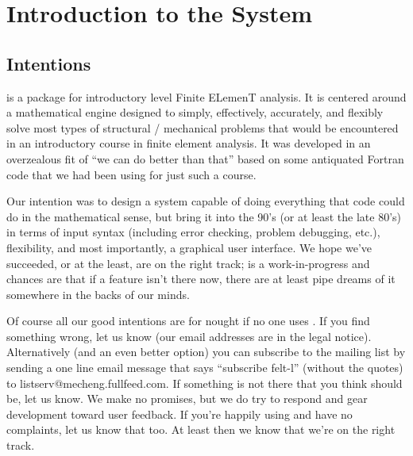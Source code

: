 
\newpage{\pagestyle{empty}\cleardoublepage}

\chapter{Introduction to the \felt{} System}
\label{intro}

\section{Intentions}
\label{intro.intentions}
\felt{} is a package for introductory level Finite ELemenT analysis.  It is
centered around a mathematical engine designed to simply, effectively,
accurately, and flexibly solve most types of structural / mechanical problems
that would be encountered in an introductory course in finite element
analysis.  It was developed in an overzealous fit of ``we can do better
than that'' based on some antiquated Fortran code that we had been using for 
just such a course. 

Our intention was to design a system capable of doing everything that 
code could do in the mathematical sense, but bring it into the 90's (or at 
least the late 80's) in terms of input syntax (including error checking, 
problem debugging, etc.), flexibility, and most importantly, a graphical user
interface.  We hope we've succeeded, or at the least, are on the right
track; \felt{} is a work-in-progress and chances are that if a 
feature isn't there now, there are at least pipe dreams of it somewhere
in the backs of our minds.   

Of course all our good intentions are for nought if no one uses \felt{}.  If
you find something wrong, let us know (our email addresses are in the
legal notice).  Alternatively (and an even better option) you can subscribe to
the \felt{} mailing list by sending a one line email message that says
``subscribe felt-l'' (without the quotes) to listserv@mecheng.fullfeed.com.
If something is not there that you think should be, let us know.
We make no promises, but we do try to respond and gear development toward 
user feedback.  If you're happily using \felt{} and have no complaints, let 
us know that too.  At least then we know that we're on the right track.

